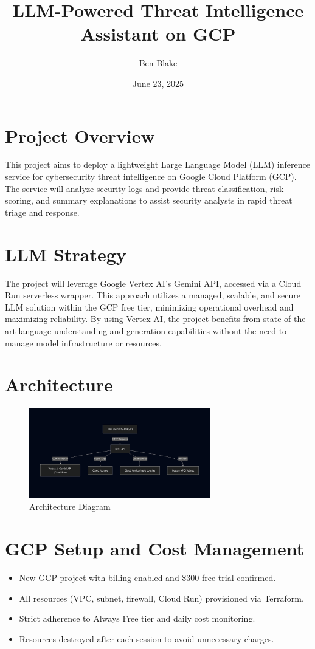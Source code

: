 \documentclass[10pt]{article}
\title{LLM-Powered Threat Intelligence Assistant on GCP}
\author{Ben Blake}
\date{June 23, 2025}
\begin{document}
\maketitle

\section*{Project Overview}
This project aims to deploy a lightweight Large Language Model (LLM) inference service for cybersecurity threat intelligence on Google Cloud Platform (GCP). The service will analyze security logs and provide threat classification, risk scoring, and summary explanations to assist security analysts in rapid threat triage and response.

\section*{LLM Strategy}
The project will leverage Google Vertex AI's Gemini API, accessed via a Cloud Run serverless wrapper. This approach utilizes a managed, scalable, and secure LLM solution within the GCP free tier, minimizing operational overhead and maximizing reliability. By using Vertex AI, the project benefits from state-of-the-art language understanding and generation capabilities without the need to manage model infrastructure or resources.

\section*{Architecture}
\begin{figure}[H]
    \centering
    \includegraphics[width=0.7\textwidth]{images/diagram.png}
    \caption{Architecture Diagram}
    \label{fig:architecture}
\end{figure}

\section*{GCP Setup and Cost Management}
\begin{itemize}[leftmargin=*, itemsep=0.5em]
    \item New GCP project with billing enabled and \$300 free trial confirmed.
    \item All resources (VPC, subnet, firewall, Cloud Run) provisioned via Terraform.
    \item Strict adherence to Always Free tier and daily cost monitoring.
    \item Resources destroyed after each session to avoid unnecessary charges.
\end{itemize}
\end{document}
